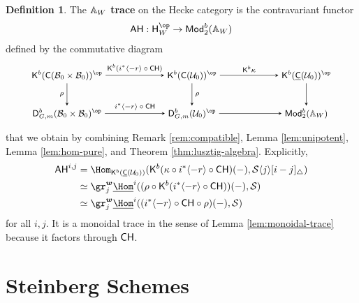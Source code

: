 \documentclass[a4paper,10pt,leqno]{amsart}
\theoremstyle{plain}
\theoremstyle{plain}
\theoremstyle{plain}
\theoremstyle{definition}
\newtheorem{df}[thm]{Definition}
\theoremstyle{remark}
\newcommand{\dfemph}[1]{\textbf{#1}}
\newcommand{\Mod}{\mathsf{Mod}}
\begin{document}
\begin{df}
The \dfemph{$\bb{A}_W$ trace} on the Hecke category is the contravariant functor
\begin{align}
\sf{AH} : \sf{H}_W^\op \to \Mod_2^b(\bb{A}_W)
\end{align}
defined by the commutative diagram
\begin{equation}\label{eq:a_w}
{\small
\begin{tikzpicture}[baseline=(current bounding box.center), >=stealth]
\matrix(m)[matrix of math nodes, row sep=2.5em, column sep=6.5em, text height=2ex, text depth=0.5ex]
{	\sf{K}^b(\sf{C}(\cal{B}_0 \times \cal{B}_0))^\op
		&\sf{K}^b(\sf{C}(\cal{U}_0))^\op
		&\sf{K}^b(\underline{\sf{C}}(\cal{U}_0))^\op\\
	\sf{D}_{G, m}^b(\cal{B}_0 \times \cal{B}_0)^\op
		&\sf{D}_{G, m}^b(\cal{U}_0)^\op
		&\Mod_2^b(\bb{A}_W)\\
		};
\path[->,font=\scriptsize, auto]
(m-1-1)		edge node{$\sf{K}^b(i^\ast\langle -r\rangle \circ \sf{CH})$} (m-1-2)
(m-2-1)		edge node{$i^\ast\langle -r\rangle \circ \sf{CH}$} (m-2-2)
(m-1-2) 	edge node{$\sf{K}^b\kappa$} (m-1-3)
(m-1-1)		edge node[left]{$\rho$} (m-2-1)
(m-1-2)		edge node{$\rho$} (m-2-2)
(m-1-3)		edge (m-2-3)
(m-2-2)		edge (m-2-3);
\end{tikzpicture}}
\end{equation}
that we obtain by combining Remark \ref{rem:compatible}, Lemma \ref{lem:unipotent}, Lemma \ref{lem:hom-pure}, and Theorem \ref{thm:lusztig-algebra}.
Explicitly,
\begin{align}\begin{split}
\sf{AH}^{i, j} 
&=	\Hom_{\sf{K}^b(\underline{\sf{C}}(\cal{U}_0))}(\sf{K}^b(\kappa \circ i^\ast\langle -r\rangle \circ \sf{CH})(-), \cal{S}\langle j\rangle [i - j]_\triangle)\\
&\simeq 
	\gr_j^{\bm{w}} \SHom^i((\rho \circ \sf{K}^b(i^\ast\langle -r\rangle \circ \sf{CH}))(-), \cal{S})\\
&\simeq
	\gr_j^{\bm{w}} \SHom^i((i^\ast\langle -r\rangle \circ \sf{CH} \circ \rho)(-), \cal{S})
\end{split}\end{align}
for all $i, j$.
It is a monoidal trace in the sense of Lemma \ref{lem:monoidal-trace} because it factors through $\sf{CH}$.
\end{df}



\newpage
\section{Steinberg Schemes}\label{sec:steinberg}
\end{document}
